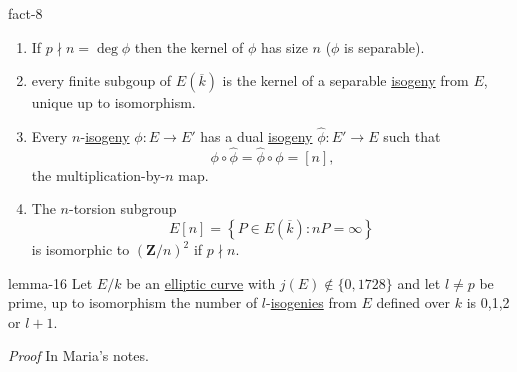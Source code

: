 \documentclass[10pt,]{book}
\makeatletter
\renewcommand*{\proofname}{Proof}
\renewenvironment{proof}[1][\proofname]{\par
  \pushQED{\qed}%
  \normalfont \topsep6\p@\@plus6\p@\relax
  \trivlist
  \item\relax
    {\itshape
    #1\@addpunct{.}}\hspace\labelsep\ignorespaces
}{%
  \popQED\endtrivlist\@endpefalse
}
\numberwithin{equation}{section}
\newcommand{\lb}{[}
\newcommand{\rb}{]}
\newcommand{\ZZ}{\mathbf{Z}}
\makeatother
\begin{document}
\begin{fact}{}{}{fact-8}%
\hypertarget{p-791}{}%
\leavevmode%
\begin{enumerate}
\item\hypertarget{li-185}{}If \(p \nmid n = \deg \phi\) then the kernel of \(\phi\) has size \(n\) (\(\phi\) is separable).%
\item\hypertarget{li-186}{}every finite subgoup of \(E(\overline k )\) is the kernel of a separable \hyperref[def-supersing-isog-isog]{isogeny} from \(E\), unique up to isomorphism.%
\item\hypertarget{li-187}{}Every \(n\)-\hyperref[def-supersing-isog-isog]{isogeny} \(\phi\colon E \to E'\) has  a dual \hyperref[def-supersing-isog-isog]{isogeny} \(\hat \phi \colon E' \to E\) such that%
\begin{equation*}
\phi\circ \hat\phi = \hat\phi \circ \phi = \lb n \rb\text{,}
\end{equation*}
the multiplication-by-\(n \) map.%
\item\hypertarget{li-188}{}The \(n\)-torsion subgroup%
\begin{equation*}
E\lb n \rb = \left\{ P \in E(\overline k) : nP = \infty\right\}
\end{equation*}
is isomorphic to \((\ZZ/n)^2\) if \(p\nmid n\).%
\end{enumerate}
%
\end{fact}
\begin{lemma}{}{}{lemma-16}%
\hypertarget{p-792}{}%
Let \(E/k\) be an \hyperref[def-supersing-isog-ec]{elliptic curve} with \(j(E) \not\in\{0,1728\}\) and let \(l\ne p\) be prime, up to isomorphism the number of \(l\)-\hyperref[def-supersing-isog-isog]{isogenies} from \(E\) defined over \(k\) is 0,1,2 or \(l+1\).%
\end{lemma}
\begin{proof}\hypertarget{proof-104}{}
\hypertarget{p-793}{}%
In Maria's notes.%
\end{proof}
%
%
\typeout{************************************************}
\typeout{************************************************}
%
\end{document}
